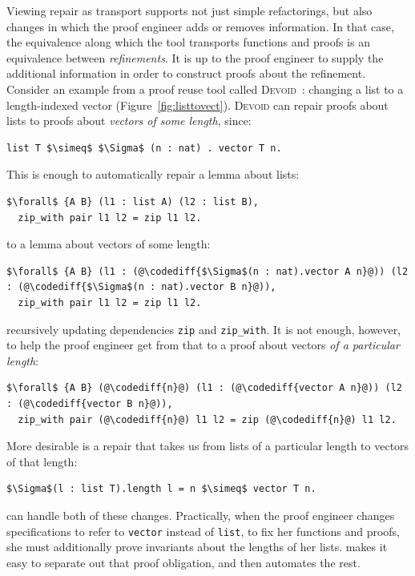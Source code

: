 Viewing repair as transport supports not just simple refactorings,
but also changes in which the proof engineer adds or removes information.
In that case, the equivalence along which the tool transports functions and proofs
is an equivalence between \textit{refinements}.
It is up to the proof engineer to supply the additional information in order to construct proofs about the refinement.
Consider an example from a proof reuse tool called \textsc{Devoid}~\cite{Ringer2019}:
changing a list to a length-indexed vector (Figure~\ref{fig:listtovect}).
\textsc{Devoid} can repair proofs about lists to proofs about \textit{vectors of some length}, since:

\begin{lstlisting}
list T $\simeq$ $\Sigma$ (n : nat) . vector T n.
\end{lstlisting}
This is enough to automatically repair a lemma about lists:

\begin{lstlisting}
$\forall$ {A B} (l1 : list A) (l2 : list B),
  zip_with pair l1 l2 = zip l1 l2.
\end{lstlisting}
to a lemma about vectors of some length:

\begin{lstlisting}
$\forall$ {A B} (l1 : (@\codediff{$\Sigma$(n : nat).vector A n}@)) (l2 : (@\codediff{$\Sigma$(n : nat).vector B n}@)),
  zip_with pair l1 l2 = zip l1 l2.
\end{lstlisting}
recursively updating dependencies \lstinline{zip} and \lstinline{zip_with}.
It is not enough, however, to help the proof engineer get from that to a proof about vectors \textit{of a particular length}:

\begin{lstlisting}
$\forall$ {A B} (@\codediff{n}@) (l1 : (@\codediff{vector A n}@)) (l2 : (@\codediff{vector B n}@)),
  zip_with pair (@\codediff{n}@) l1 l2 = zip (@\codediff{n}@) l1 l2.
\end{lstlisting}

More desirable is a repair that takes us from lists of a particular length to vectors of that length:

\begin{lstlisting}
$\Sigma$(l : list T).length l = n $\simeq$ vector T n.
\end{lstlisting}
\toolname can handle both of these changes.
Practically, when the proof engineer changes specifications to refer to \lstinline{vector} instead of \lstinline{list},
to fix her functions and proofs, she must additionally prove invariants about the lengths of her lists.
\toolname makes it easy to separate out that proof obligation, and then automates the rest.

